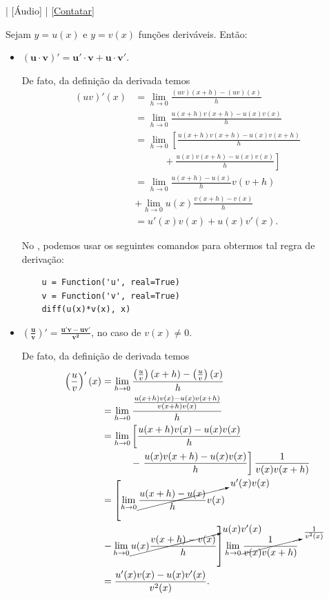 \begin{flushright}
  [Vídeo] | [Áudio] | \href{https://phkonzen.github.io/notas/contato.html}{[Contatar]}
\end{flushright}

Sejam $y = u(x)$ e $y = v(x)$ funções deriváveis. Então:
\begin{itemize}
\item $\pmb{(u\cdot v)' = u'\cdot v+u\cdot v'}$.

  De fato, da definição da derivada temos
  \begin{align}
    (uv)'(x) &= \lim_{h\to 0} \frac{(uv)(x+h)-(uv)(x)}{h}\\
             &= \lim_{h\to 0} \frac{u(x+h)v(x+h)-u(x)v(x)}{h}\\
             &= \lim_{h\to 0} \left[\frac{u(x+h)v(x+h)-u(x)v(x+h)}{h}\right.\\
             &\qquad\quad+ \left.\frac{u(x)v(x+h)-u(x)v(x)}{h}\right]\\
             &= \lim_{h\to 0} \frac{u(x+h)-u(x)}{h}v(v+h) \\
             &+ \lim_{h\to 0} u(x)\frac{v(x+h)-v(x)}{h}\\
             &= u'(x)v(x) + u(x)v'(x).
  \end{align}
  
  \ifispython
  No \sympy, podemos usar os seguintes comandos para obtermos tal regra de derivação:
  \begin{lstlisting}
    u = Function('u', real=True)
    v = Function('v', real=True)
    diff(u(x)*v(x), x)
  \end{lstlisting}
  \fi
  
\item $\displaystyle\pmb{\left(\frac{u}{v}\right)' = \frac{u'v-uv'}{v^2}}$, no caso de $v(x)\neq 0$.

  De fato, da definição de derivada temos
  \begin{align}
    \left(\frac{u}{v}\right)'(x) &= \lim_{h\to 0} \frac{\left(\frac{u}{v}\right)(x+h)-\left(\frac{u}{v}\right)(x)}{h} \\
                                 &= \lim_{h\to 0} \frac{\frac{u(x+h)v(x)-u(x)v(x+h)}{v(x+h)v(x)}}{h}\\
                                 &= \lim_{h\to 0} \left[\frac{u(x+h)v(x)-u(x)v(x)}{h}\right. \\
                                 &\qquad\quad - \left.\frac{u(x)v(x+h)-u(x)v(x)}{h}\right]\frac{1}{v(x)v(x+h)}\\
                                 &= \left[\lim_{h\to 0} \cancelto{u'(x)v(x)}{\frac{u(x+h)-u(x)}{h}v(x)}\right. \\
                                 &\left. - \lim_{h\to 0} \cancelto{u(x)v'(x)}{u(x)\frac{v(x+h)-v(x)}{h}}\right]\lim_{h\to 0} \cancelto{\frac{1}{v^2(x)}}{\frac{1}{v(x)v(x+h)}}\\
                                 &= \frac{u'(x)v(x)-u(x)v'(x)}{v^2(x)}.
  \end{align}
  

\end{itemize}
